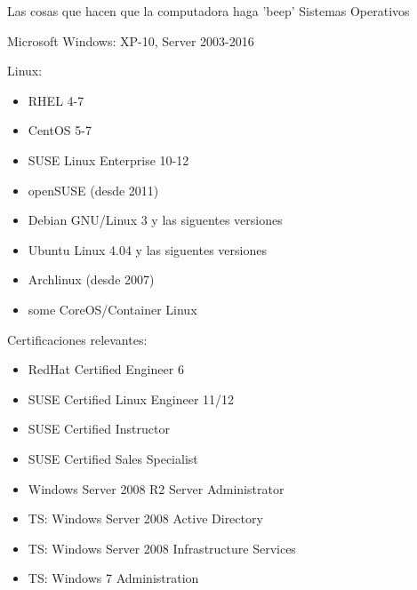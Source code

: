 

\begin{cventries}
  \cventry
    {Las cosas que hacen que la computadora haga 'beep'}
    {Sistemas Operativos}
		{}
    {}
    {
			\begin{cvitems}
				\item Microsoft Windows: XP-10, Server 2003-2016
				\item Linux:
          \begin{itemize}
            \item RHEL 4-7
            \item CentOS 5-7
            \item SUSE Linux Enterprise 10-12
            \item openSUSE (desde 2011)
            \item Debian GNU/Linux 3 y las siguentes versiones
            \item Ubuntu Linux 4.04 y las siguentes versiones
            \item Archlinux (desde 2007)
            \item some CoreOS/Container Linux
          \end{itemize}
        \item Certificaciones relevantes:
          \begin{itemize}
            \item RedHat Certified Engineer 6
            \item SUSE Certified Linux Engineer 11/12
            \item SUSE Certified Instructor
            \item SUSE Certified Sales Specialist
            \item Windows Server 2008 R2 Server Administrator
            \item TS: Windows Server 2008 Active Directory
            \item TS: Windows Server 2008 Infrastructure Services
            \item TS: Windows 7 Administration
          \end{itemize}
      \end{cvitems}
    }


\end{cventries}
